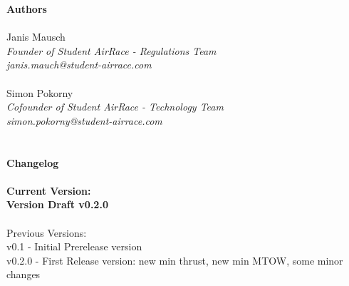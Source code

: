 \documentclass{article}
\newcommand*{\getVersion}{v0.2.0}
\begin{document}


\tableofcontents{}

\newpage
{\bf Authors}
\\ \\Janis Mausch \emph{\\Founder of Student AirRace - Regulations Team \\janis.mauch@student-airrace.com}
\\ \\ Simon Pokorny \emph{\\Cofounder of Student AirRace - Technology Team \\simon.pokorny@student-airrace.com}
\\ \\ \\
{\bf Changelog}
\\ \\{\bf Current Version: \\Version Draft \getVersion{}}
\\ \\Previous Versions: 
\\ v0.1 - Initial Prerelease version
\\ v0.2.0 - First Release version: new min thrust, new min MTOW, some minor changes
\end{document}

